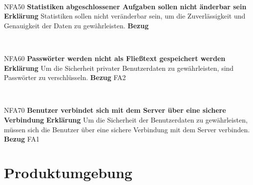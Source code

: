 \documentclass[a4paper,12pt]{article}
\begin{document}
\begin{itemize}[nosep]
\begin{minipage}[t]{\linewidth}
	\end{minipage}
	\newline
	\\
	
	\begin{minipage}[t]{\linewidth}
		\item[NFA50] \hspace{\parindent} \textbf{Statistiken abgeschlossener Aufgaben sollen nicht änderbar sein}
		\subitem \textbf{Erklärung} Statistiken sollen nicht veränderbar sein, um die Zuverlässigkeit und Genauigkeit der Daten zu gewährleisten.
\subitem \textbf{Bezug} %
	
	\end{minipage}
	\newline
	\\
	
	\begin{minipage}[t]{\linewidth}
		\item[NFA60]\hspace{\parindent} \textbf{Passwörter werden nicht als Fließtext gespeichert werden}
		\subitem \textbf{Erklärung} Um die Sicherheit privater Benutzerdaten zu gewährleisten, sind Passwörter zu verschlüsseln.
\subitem \textbf{Bezug} FA2
	
	\end{minipage}
	\newline
	\\
	
	\begin{minipage}[t]{\linewidth}
		\item[NFA70]\hspace{\parindent}  \textbf{Benutzer verbindet sich mit dem Server über eine sichere Verbindung}
		\subitem \textbf{Erklärung} Um die Sicherheit der Benutzerdaten zu gewährleisten, müssen sich die Benutzer über eine sichere Verbindung mit dem Server verbinden.
\subitem \textbf{Bezug} FA1
	
	\end{minipage}
\end{itemize}
\newpage

\section{Produktumgebung}
\end{document}

